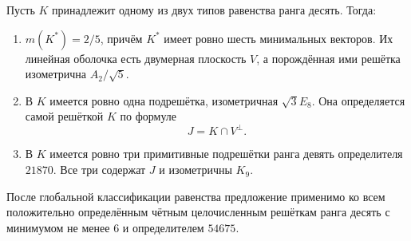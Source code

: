 
\begin{proposition}
\label{prop:intrinsic-rank-ten}
Пусть $K$ принадлежит одному из двух типов равенства ранга десять. Тогда:
\begin{enumerate}
\item $m(K^*)=2/5$, причём $K^*$ имеет ровно шесть минимальных векторов.
      Их линейная оболочка есть двумерная плоскость $V$, а порождённая
      ими решётка изометрична $A_2/\sqrt5$.
\item В $K$ имеется ровно одна подрешётка, изометричная $\sqrt3E_8$.
      Она определяется самой решёткой $K$ по формуле
      \[
        J=K\cap V^\perp.
      \]
\item В $K$ имеется ровно три примитивные подрешётки ранга девять
      определителя $21870$. Все три содержат $J$ и изометричны $K_9$.
\end{enumerate}
После глобальной классификации равенства предложение применимо ко всем
положительно определённым чётным целочисленным решёткам ранга десять
с минимумом не менее $6$ и определителем $54675$.
\end{proposition}

